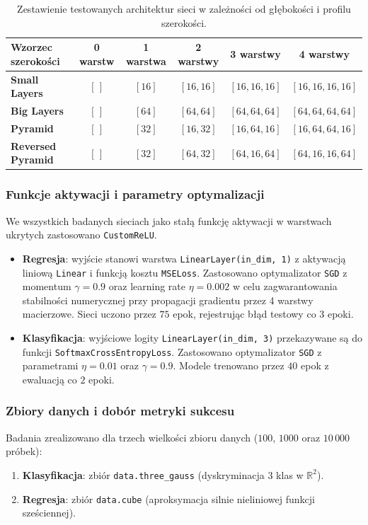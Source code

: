\documentclass[11pt,a4paper]{article}
\begin{document}
\begin{table}[!htbp]
\centering
\caption{Zestawienie testowanych architektur sieci w zależności od głębokości i profilu szerokości.}
\label{tab:architectures}
\begin{tabular}{lccccc}
\toprule
\textbf{Wzorzec szerokości} & \textbf{0 warstw} & \textbf{1 warstwa} & \textbf{2 warstwy} & \textbf{3 warstwy} & \textbf{4 warstwy} \\
\midrule
\textbf{Small Layers} & $[ \, ]$ & $[16]$ & $[16, 16]$ & $[16, 16, 16]$ & $[16, 16, 16, 16]$ \\
\textbf{Big Layers} & $[ \, ]$ & $[64]$ & $[64, 64]$ & $[64, 64, 64]$ & $[64, 64, 64, 64]$ \\
\textbf{Pyramid} & $[ \, ]$ & $[32]$ & $[16, 32]$ & $[16, 64, 16]$ & $[16, 64, 64, 16]$ \\
\textbf{Reversed Pyramid} & $[ \, ]$ & $[32]$ & $[64, 32]$ & $[64, 16, 64]$ & $[64, 16, 16, 64]$ \\
\bottomrule
\end{tabular}
\end{table}

\subsubsection{Funkcje aktywacji i parametry optymalizacji}
We wszystkich badanych sieciach jako stałą funkcję aktywacji w warstwach ukrytych zastosowano \texttt{CustomReLU}.
\begin{itemize}
    \item \textbf{Regresja}: wyjście stanowi warstwa \texttt{LinearLayer(in\_dim, 1)} z aktywacją liniową \texttt{Linear} i funkcją kosztu \texttt{MSELoss}. Zastosowano optymalizator \texttt{SGD} z momentum $\gamma = 0.9$ oraz learning rate $\eta = 0.002$ w celu zagwarantowania stabilności numerycznej przy propagacji gradientu przez 4 warstwy macierzowe. Sieci uczono przez $75$ epok, rejestrując błąd testowy co $3$ epoki.
    \item \textbf{Klasyfikacja}: wyjściowe logity \texttt{LinearLayer(in\_dim, 3)} przekazywane są do funkcji \texttt{SoftmaxCrossEntropyLoss}. Zastosowano optymalizator \texttt{SGD} z parametrami $\eta = 0.01$ oraz $\gamma = 0.9$. Modele trenowano przez $40$ epok z ewaluacją co $2$ epoki.
\end{itemize}

\subsubsection{Zbiory danych i dobór metryki sukcesu}
Badania zrealizowano dla trzech wielkości zbioru danych ($100$, $1000$ oraz $10\,000$ próbek):
\begin{enumerate}
    \item \textbf{Klasyfikacja}: zbiór \texttt{data.three\_gauss} (dyskryminacja 3 klas w $\mathbb{R}^2$).
    \item \textbf{Regresja}: zbiór \texttt{data.cube} (aproksymacja silnie nieliniowej funkcji sześciennej).
\end{enumerate}
\end{document}
